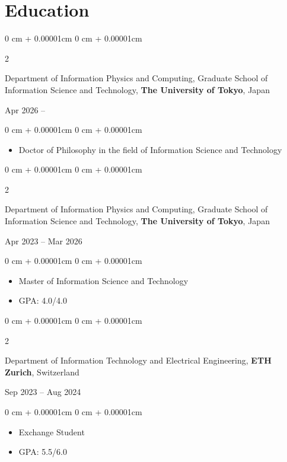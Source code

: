 \documentclass[11pt, letterpaper]{article}
\newenvironment{highlights}{
    \begin{itemize}[
        topsep=0.0cm,
        parsep=0.0cm,
        partopsep=0pt,
        itemsep=0pt,
        leftmargin=10pt
    ]
}{
    \end{itemize}
} %
\newenvironment{onecolentry}{
    \begin{adjustwidth}{
        0 cm + 0.00001cm
    }{
        0 cm + 0.00001cm
    }
}{
    \end{adjustwidth}
} %
\newenvironment{twocolentry}[2][]{
    \onecolentry
    \def\secondColumn{#2}
    \setcolumnwidth{\fill, 3.5cm}
    \begin{paracol}{2}
}{
    \switchcolumn \raggedleft \secondColumn
    \end{paracol}
    \endonecolentry
} %
\begin{document}
  \section{Education}
    \begin{twocolentry}{Apr 2026 -- }
      Department of Information Physics and Computing,
      Graduate School of Information Science and Technology,
      \textbf{The University of Tokyo}, Japan
    \end{twocolentry}
    \vspace{0.10 cm}
    \begin{onecolentry}
      \begin{highlights}
        \item Doctor of Philosophy in the field of Information Science and Technology
      \end{highlights}
    \end{onecolentry}
    \vspace{0.25cm}
    \begin{twocolentry}{Apr 2023 -- Mar 2026}
      Department of Information Physics and Computing,
      Graduate School of Information Science and Technology,
      \textbf{The University of Tokyo}, Japan
    \end{twocolentry}
    \vspace{0.10 cm}
    \begin{onecolentry}
      \begin{highlights}
        \item Master of Information Science and Technology
        \item GPA: 4.0/4.0
      \end{highlights}
    \end{onecolentry}
    \vspace{0.25cm}
    \begin{twocolentry}{Sep 2023 -- Aug 2024}
      Department of Information Technology and Electrical Engineering,
      \textbf{ETH Zurich}, Switzerland
    \end{twocolentry}
    \vspace{0.10cm}
    \begin{onecolentry}
      \begin{highlights}
        \item Exchange Student
        \item GPA: 5.5/6.0
      \end{highlights}
    \end{onecolentry}
    \vspace{0.25cm}
\end{document}
